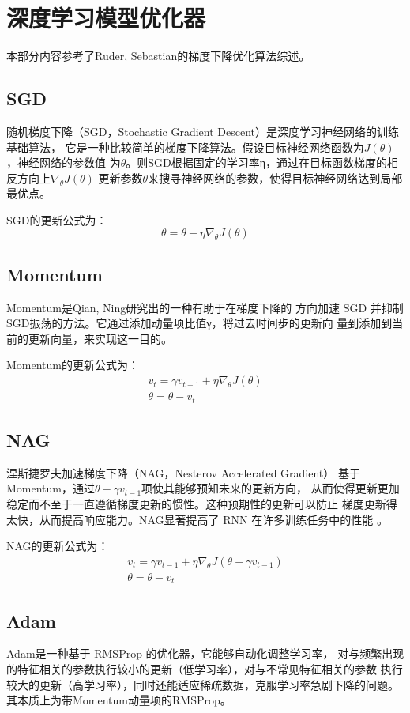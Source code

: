 \documentclass[AutoFakeBold]{LZUThesis}
\begin{document}
\section{深度学习模型优化器}
本部分内容参考了Ruder, Sebastian的梯度下降优化算法综述\cite{ruder2016overview}。
\subsection{SGD}
随机梯度下降（SGD，Stochastic Gradient Descent）是深度学习神经网络的训练基础算法，
它是一种比较简单的梯度下降算法。假设目标神经网络函数为$J(\theta)$，神经网络的参数值
为$\theta$。则SGD根据固定的学习率η，通过在目标函数梯度的相反方向上$\nabla_\theta J( \theta)$
更新参数$\theta$来搜寻神经网络的参数，使得目标神经网络达到局部最优点。

SGD的更新公式为：
$$\theta = \theta - \eta\nabla_\theta J( \theta)$$

\subsection{Momentum}
Momentum是Qian, Ning研究出的\cite{qian1999momentum}一种有助于在梯度下降的
方向加速 SGD 并抑制SGD振荡的方法。它通过添加动量项比值γ，将过去时间步的更新向
量到添加到当前的更新向量，来实现这一目的。

Momentum的更新公式为：
$$
\begin{matrix}
v_t = \gamma v_{t-1} + \eta \nabla_\theta J( \theta)\\
\theta = \theta - v_t
\end{matrix}
$$

\subsection{NAG}
涅斯捷罗夫加速梯度下降（NAG，Nesterov Accelerated Gradient）\cite{nesterov1983method}
基于Momentum，通过$\theta - \gamma v_{t-1}$项使其能够预知未来的更新方向，
从而使得更新更加稳定而不至于一直遵循梯度更新的惯性。这种预期性的更新可以防止
梯度更新得太快，从而提高响应能力。NAG显著提高了 RNN 在许多训练任务中的性能
\cite{bengio2013advances}。

NAG的更新公式为：
$$
\begin{matrix}
v_t = \gamma v_{t-1} + \eta \nabla_\theta J( \theta - \gamma v_{t-1} )\\ 
\theta = \theta - v_t 
\end{matrix}
$$

\subsection{Adam}
Adam\cite{kingma2014adam}是一种基于 RMSProp 的优化器，它能够自动化调整学习率，
对与频繁出现的特征相关的参数执行较小的更新（低学习率），对与不常见特征相关的参数
执行较大的更新（高学习率），同时还能适应稀疏数据，克服学习率急剧下降的问题。
其本质上为带Momentum动量项的RMSProp。
\end{document}

